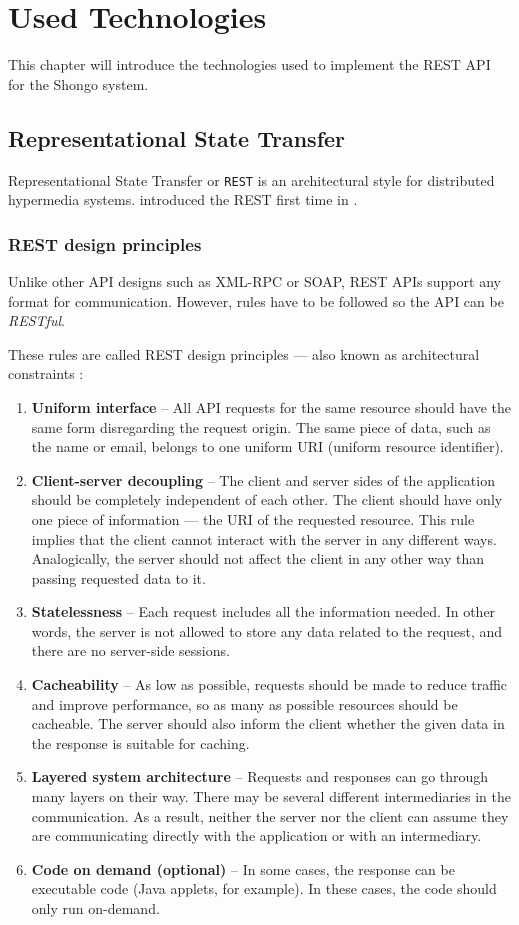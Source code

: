 \chapter{Used Technologies} \label{cha:technologies}
This chapter will introduce the technologies used to implement the REST API for the Shongo system.


\section{Representational State Transfer} \label{rest}
Representational State Transfer or \texttt{REST} is an architectural style for distributed hypermedia systems. \citeauthor{fielding2000rest} introduced the REST first time in \citeyear{fielding2000rest} \cite{fielding2000rest}.
\subsection{REST design principles}
Unlike other API designs such as XML-RPC or SOAP, REST APIs support any format for communication. However, rules have to be followed so the API can be \emph{RESTful}.

These rules are called REST design principles --- also known as architectural constraints \cite{ibmrest}:
\begin{enumerate}
    \item \textbf{Uniform interface} -- All API requests for the same resource should have the same form disregarding the request origin. The same piece of data, such as the name or email, belongs to one uniform URI (uniform resource identifier).
    \item \textbf{Client-server decoupling} -- The client and server sides of the application should be completely independent of each other. The client should have only one piece of information — the URI of the requested resource. This rule implies that the client cannot interact with the server in any different ways. Analogically, the server should not affect the client in any other way than passing requested data to it.
    \item \textbf{Statelessness} -- Each request includes all the information needed. In other words, the server is not allowed to store any data related to the request, and there are no server-side sessions.
    \item \textbf{Cacheability} -- As low as possible, requests should be made to reduce traffic and improve performance, so as many as possible resources should be cacheable. The server should also inform the client whether the given data in the response is suitable for caching.
    \item \textbf{Layered system architecture} -- Requests and responses can go through many layers on their way. There may be several different intermediaries in the communication. As a result, neither the server nor the client can assume they are communicating directly with the application or with an intermediary.
    \item \textbf{Code on demand (optional)} -- In some cases, the response can be executable code (Java applets, for example). In these cases, the code should only run on-demand.
\end{enumerate}


